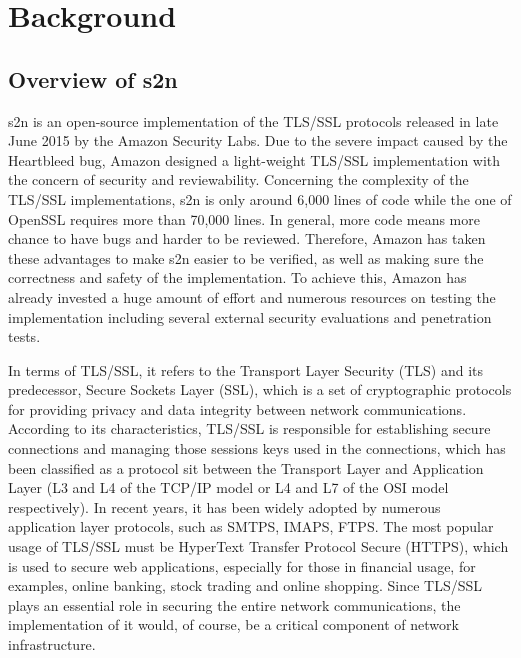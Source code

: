 
\chapter{Background}

\section{Overview of s2n}
\label{sec:s2n}
s2n \cite{3_the_s2n_user_manual, 4_introducing_s2n} is an open-source implementation of the TLS/SSL protocols released in late June 2015 by the Amazon Security Labs. Due to the severe impact caused by the Heartbleed bug, Amazon designed a light-weight TLS/SSL implementation with the concern of security and reviewability. Concerning the complexity of the TLS/SSL implementations, s2n is only around 6,000 lines of code while the one of OpenSSL requires more than 70,000 lines. In general, more code means more chance to have bugs and harder to be reviewed. Therefore, Amazon has taken these advantages to make s2n easier to be verified, as well as making sure the correctness and safety of the implementation. To achieve this, Amazon has already invested a huge amount of effort and numerous resources on testing the implementation including several external security evaluations and penetration tests.

In terms of TLS/SSL, it refers to the Transport Layer Security (TLS) and its predecessor, Secure Sockets Layer (SSL), which is a set of cryptographic protocols for providing privacy and data integrity between network communications. According to its characteristics, TLS/SSL is responsible for establishing secure connections and managing those sessions keys used in the connections, which has been classified as a protocol sit between the Transport Layer and Application Layer (L3 and L4 of the TCP/IP model or L4 and L7 of the OSI model respectively). In recent years, it has been widely adopted by numerous application layer protocols, such as SMTPS, IMAPS, FTPS. The most popular usage of TLS/SSL must be HyperText Transfer Protocol Secure (HTTPS), which is used to secure web applications, especially for those in financial usage, for examples, online banking, stock trading and online shopping. Since TLS/SSL plays an essential role in securing the entire network communications, the implementation of it would, of course, be a critical component of network infrastructure.

